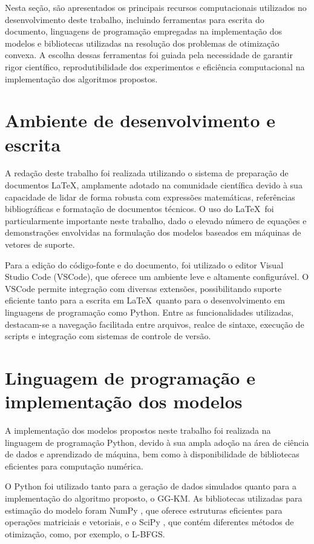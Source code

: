 
\noindent Nesta seção, são apresentados os principais recursos computacionais utilizados no
desenvolvimento deste trabalho, incluindo ferramentas para escrita do documento,
linguagens de programação empregadas na implementação dos modelos e bibliotecas utilizadas
na resolução dos problemas de otimização convexa. A escolha dessas ferramentas foi guiada
pela necessidade de garantir rigor científico, reprodutibilidade dos experimentos e
eficiência computacional na implementação dos algoritmos propostos.

\section{Ambiente de desenvolvimento e escrita}

A redação deste trabalho foi realizada utilizando o sistema de preparação de documentos
\LaTeX, amplamente adotado na comunidade científica devido à sua capacidade de lidar de
forma robusta com expressões matemáticas, referências bibliográficas e formatação de
documentos técnicos. O uso do \LaTeX\ foi particularmente importante neste trabalho,
dado o elevado número de equações e demonstrações envolvidas na formulação dos modelos
baseados em máquinas de vetores de suporte.

Para a edição do código-fonte e do documento, foi utilizado o editor Visual Studio Code
(VSCode), que oferece um ambiente leve e altamente configurável. O VSCode permite integração
com diversas extensões, possibilitando suporte eficiente tanto para a escrita em \LaTeX\
quanto para o desenvolvimento em linguagens de programação como Python. Entre as
funcionalidades utilizadas, destacam-se a navegação facilitada entre arquivos,
realce de sintaxe, execução de scripts e integração com sistemas de controle de versão.

\section{Linguagem de programação e implementação dos modelos}

A implementação dos modelos propostos neste trabalho foi realizada na linguagem de
programação Python, devido à sua ampla adoção na área de ciência de dados e aprendizado
de máquina, bem como à disponibilidade de bibliotecas eficientes para computação numérica.

O Python foi utilizado tanto para a geração de dados simulados quanto para a implementação
do algoritmo proposto, o GG-KM. As bibliotecas utilizadas para estimação do modelo foram NumPy \cite{harris2020array},
que oferece estruturas eficientes para operações matriciais e vetoriais, e o SciPy \cite{virtanen2020scipy}, que contém
diferentes métodos de otimização, como, por exemplo, o L-BFGS.

